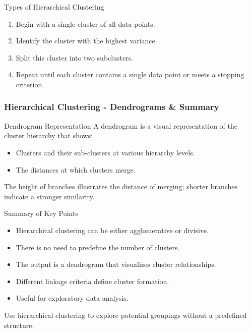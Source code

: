 \documentclass[aspectratio=169]{beamer}
\begin{document}
\begin{frame}[fragile]
\begin{block}{Types of Hierarchical Clustering}
\begin{enumerate}
\begin{itemize}
                        \begin{enumerate}
                            \item Begin with a single cluster of all data points.
                            \item Identify the cluster with the highest variance.
                            \item Split this cluster into two subclusters.
                            \item Repeat until each cluster contains a single data point or meets a stopping criterion.
                        \end{enumerate}
                \end{itemize}
        \end{enumerate}
    \end{block}
\end{frame}

\begin{frame}[fragile]
    \frametitle{Hierarchical Clustering - Dendrograms & Summary}
    \begin{block}{Dendrogram Representation}
        A dendrogram is a visual representation of the cluster hierarchy that shows:
        \begin{itemize}
            \item Clusters and their sub-clusters at various hierarchy levels.
            \item The distances at which clusters merge.
        \end{itemize}
        The height of branches illustrates the distance of merging; shorter branches indicate a stronger similarity.
    \end{block}
    
    \begin{block}{Summary of Key Points}
        \begin{itemize}
            \item Hierarchical clustering can be either agglomerative or divisive.
            \item There is no need to predefine the number of clusters.
            \item The output is a dendrogram that visualizes cluster relationships.
            \item Different linkage criteria define cluster formation.
            \item Useful for exploratory data analysis.
        \end{itemize}
        Use hierarchical clustering to explore potential groupings without a predefined structure.
    \end{block}
\end{frame}
\end{document}

